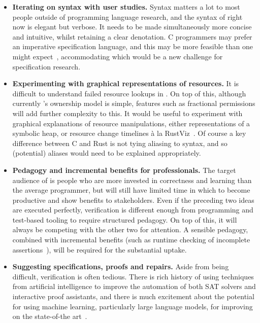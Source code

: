 \begin{itemize}
    \item \textbf{Iterating on syntax with user studies.} Syntax matters
        a lot to most people outside of programming language research,
        and the syntax of  right now is elegant but verbose. It
        needs to be made simultaneously more concise and intuitive, whilst
        retaining a clear denotation. C programmers may prefer an imperative
        specification language, and this may be more feasible than one might
        expect~, accommodating which would be a new
        challenge for specification research.
    \item \textbf{Experimenting with graphical representations of resources.}
        It is difficult to understand failed resource lookups in .
        On top of this, although currently 's ownership model is simple,
        features such as fractional permissions will add further complexity to
        this. It would be useful to experiment with graphical explanations of
        resource manipulations, either representations of a symbolic heap, or
        resource change timelines à la
        RustViz~.
        Of course a key difference between C and Rust is not tying aliasing
        to syntax, and so (potential) aliases would need to be explained
        appropriately.
    \item \textbf{Pedagogy and incremental benefits for professionals.}
        The target audience of  is people who are more invested in
        correctness and learning than the average programmer, but will still
        have limited time in which to become productive and show benefits
        to stakeholders. Even if the preceding two ideas are executed perfectly,
        verification is different enough from programming and test-based tooling
        to require structured pedagogy. On top of this, it will always be
        competing with the other two for attention. A sensible pedagogy,
        combined with incremental benefits (such as runtime checking of
        incomplete assertions~), will
        be required for the substantial uptake.
    \item \textbf{Suggesting specifications, proofs and repairs.} Aside from
        being difficult, verification is often tedious. There is rich history
        of using techniques from artificial intelligence to improve the
        automation of both SAT solvers and interactive proof assistants, and
        there is much excitement about the potential for using machine
        learning, particularly large language models, for improving on the
        state-of-the art~.
\end{itemize}

